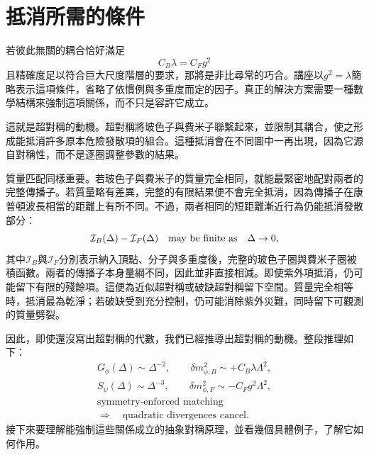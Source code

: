 \section{抵消所需的條件}

若彼此無關的耦合恰好滿足
\begin{equation}
C_B\lambda=C_Fg^2
\end{equation}
且精確度足以符合巨大尺度階層的要求，那將是非比尋常的巧合。講座以\(g^2=\lambda\)簡略表示這項條件，省略了依慣例與多重度而定的因子。真正的解決方案需要一種數學結構來強制這項關係，而不只是容許它成立。

這就是超對稱的動機。超對稱將玻色子與費米子聯繫起來，並限制其耦合，使之形成能抵消許多原本危險發散項的組合。這種抵消會在不同圖中一再出現，因為它源自對稱性，而不是逐圈調整參數的結果。

質量匹配同樣重要。若玻色子與費米子的質量完全相同，就能最緊密地配對兩者的完整傳播子。若質量略有差異，完整的有限結果便不會完全抵消，因為傳播子在康普頓波長相當的距離上有所不同。不過，兩者相同的短距離漸近行為仍能抵消發散部分：
\begin{equation}
\mathcal I_B(\Delta)-\mathcal I_F(\Delta)
\quad\hbox{may be finite as}\quad \Delta\to0,
\end{equation}
其中\(\mathcal I_B\)與\(\mathcal I_F\)分別表示納入頂點、分子與多重度後，完整的玻色子圈與費米子圈被積函數。兩者的傳播子本身量綱不同，因此並非直接相減。即使紫外項抵消，仍可能留下有限的殘餘項。這便為近似超對稱或破缺超對稱留下空間。質量完全相等時，抵消最為乾淨；若破缺受到充分控制，仍可能消除紫外災難，同時留下可觀測的質量劈裂。

因此，即使還沒寫出超對稱的代數，我們已經推導出超對稱的動機。整段推理如下：
\begin{equation}
\begin{gathered}
G_\phi(\Delta)\sim \Delta^{-2},
\qquad
\delta m_{\phi,B}^2\sim+C_B\lambda\Lambda^2,\\[0.4em]
S_\psi(\Delta)\sim \Delta^{-3},
\qquad
\delta m_{\phi,F}^2\sim-C_Fg^2\Lambda^2,\\[0.4em]
\text{symmetry-enforced matching}\\
\Longrightarrow\quad
\text{quadratic divergences cancel}.
\end{gathered}
\end{equation}
接下來要理解能強制這些關係成立的抽象對稱原理，並看幾個具體例子，了解它如何作用。